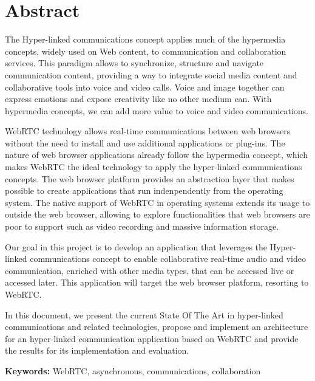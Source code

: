 \chapter*{Abstract}


The Hyper-linked communications concept applies much of the hypermedia concepts, widely used on Web content, to communication and collaboration services. This paradigm allows to synchronize, structure and navigate communication content, providing a way to integrate social media content and collaborative tools into voice and video calls.
Voice and image together can express emotions and expose creativity like no other medium can. With hypermedia concepts, we can add more value to voice and video communications.

\ac{WebRTC} technology allows real-time communications between web browsers without the need to install and use additional applications or plug-ins. The nature of web browser applications already follow the hypermedia concept, which makes \ac{WebRTC} the ideal technology to apply the hyper-linked communications concepts.
{\color{blue}The web browser platform provides an abstraction layer that makes possible to create applications that run indenpendently from the operating system.}
The native support of \ac{WebRTC} in operating systems extends its usage to outside the web browser, allowing to explore functionalities that web browsers are poor to support such as video recording and massive information storage.

Our goal in this project is to develop an application that leverages the Hyper-linked communications concept to enable collaborative real-time audio and video communication, enriched with other media types, that can be accessed live or accessed later.
This application will target the web browser platform, resorting to \ac{WebRTC}.

{\color{blue}
In this document, we present the current State Of The Art in hyper-linked communications and related technologies, propose and implement an architecture for an hyper-linked communication application based on \ac{WebRTC} and provide the results for its implementation and evaluation.
}

\vspace{1cm}

\textbf{\Large Keywords:} WebRTC, asynchronous, communications, collaboration


\cleardoublepage
